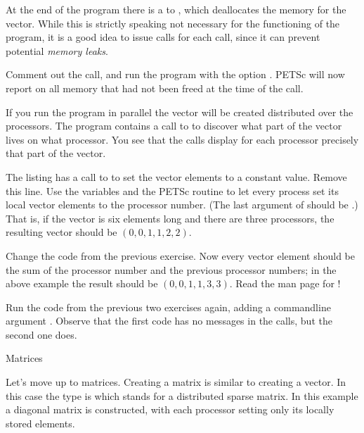 At the end of the program there is a to , which
deallocates the memory for the vector. While this is strictly speaking
not necessary for the functioning of the program, it is a good idea to
issue  calls for each  call, since it can prevent
potential \emph{memory leaks}.

\begin{exercise}
  Comment out the  call, and run the program with the
  option . PETSc will now report on all memory that
  had not been freed at the time of the  call.
\end{exercise}

If you run the program in parallel the vector will be created
distributed over the processors. The program contains 
a call to  to discover what part of the vector
lives on what processor. You see that the  calls display
for each processor precisely that part of the vector.

\begin{exercise}
  The listing has a call to  to set the vector elements to a
  constant value. Remove this line.
  Use the  variables and the PETSc routine
   to let every process set its
  local vector elements to the processor number. (The last argument of
   should be .) That is, if the
  vector is six elements long and there are three processors, the
  resulting vector should be $(0,0,1,1,2,2)$.
\end{exercise}

\begin{exercise}
  Change the code from the previous exercise. Now every vector element
  should be the sum of the processor number and the previous
  processor numbers; in the above example the result should be
  $(0,0,1,1,3,3)$. Read the man page for !
\end{exercise}

Run the code from the previous two exercises again, adding a
commandline argument . Observe that the first code has
no messages in the  calls, but the second one
does.

 {Matrices}

Let's move up to matrices. Creating a matrix is similar to creating a
vector. In this case the type is  which stands for a
distributed sparse matrix.
In this example a diagonal matrix is constructed, with each processor
setting only its locally stored elements.

